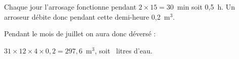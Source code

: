 
\medskip

%
%

Chaque jour l'arrosage fonctionne pendant $2 \times 15 = 30$~min soit 0,5~h. Un arroseur débite donc pendant cette demi-heure 0,2~m$^3$.

Pendant le mois de juillet on aura donc déversé :

$31 \times 12 \times 4 \times 0,2 = 297,6$~m$^3$, soit ~litres d'eau.
\vspace{0,5cm}

